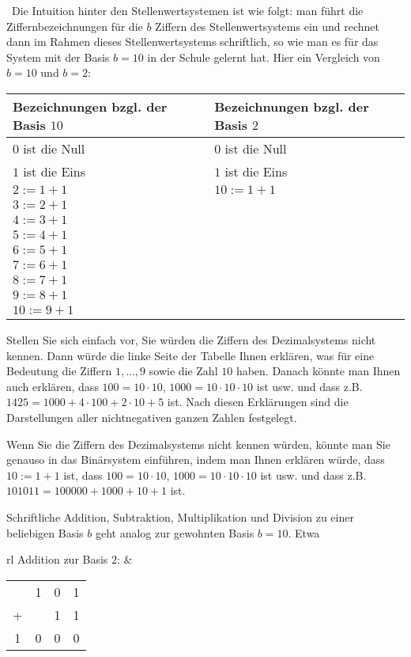 \begin{bem}\
	Die Intuition hinter den Stellenwertsystemen ist wie folgt: man führt die Ziffernbezeichnungen für die $b$ Ziffern des Stellenwertsystems ein und rechnet dann im Rahmen dieses Stellenwertsystems schriftlich, so wie man es für das System mit der Basis $b=10$ in der Schule gelernt hat. Hier ein Vergleich von $b=10$ und $b=2$: 
	\begin{center} 
		\begin{tabular}{l|l} 
			Bezeichnungen bzgl. der Basis $10$ & Bezeichnungen bzgl. der Basis $2$ 
			\\ \hline $0$ ist die Null & $0$ ist die Null
			\\ $1$ ist die Eins & $1$ ist die Eins
			\\ $2:=1+1$ & $10:=1+1$
			\\ $3:=2+1$ & 
			\\ $4:=3+1$ & 
			\\ $5:=4+1$ & 
			\\ $6:=5+1$ & 
			\\ $7:= 6+1$ & 
			\\ $8:=7+1$ & 
			\\ $9:=8+1$ & 
			\\ $10:=9+1$  
		\end{tabular} 
	\end{center} 
	Stellen Sie sich einfach vor, Sie würden die Ziffern des Dezimalsystems nicht kennen. Dann würde die linke Seite der Tabelle Ihnen erklären, was für eine Bedeutung die Ziffern $1,\ldots,9$ sowie die Zahl $10$ haben. Danach könnte man Ihnen auch erklären, dass $100 = 10 \cdot 10$, $1000 = 10 \cdot 10 \cdot 10$ ist usw. und dass z.B. $1425 = 1000 + 4 \cdot 100 + 2 \cdot 10 + 5$ ist. Nach diesen Erklärungen sind die Darstellungen aller nichtnegativen ganzen Zahlen festgelegt. 
	
	Wenn Sie die Ziffern des Dezimalsystems nicht kennen würden, könnte man Sie genauso in das Binärsystem einführen, indem man Ihnen erklären würde, dass $10:=1+1$ ist, dass $100 = 10 \cdot 10$, $1000 = 10 \cdot 10 \cdot 10$ ist usw. und dass z.B. $101011= 100000 + 1000 + 10 + 1$ ist. 
\end{bem} 


\begin{bsp}
	Schriftliche Addition, Subtraktion, Multiplikation und Division zu einer beliebigen Basis $b$ geht analog zur gewohnten Basis $b=10$. Etwa
	\begin{center}
		\begin{tabular}{rl}
			Addition zur Basis $2$:\hspace{3em} &
			\begin{tabular}{cccc}
				& 1 & 0 & 1
				\\	+ & & 1 & 1
				\\ \hline
				1 & 0 & 0 & 0
			\end{tabular}
		\end{tabular}
	\end{center}
\end{bsp}


